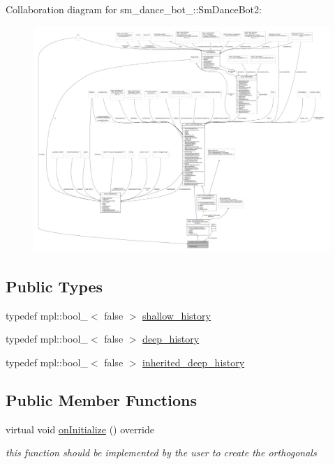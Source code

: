 Collaboration diagram for sm\+\_\+dance\+\_\+bot\+\_\+:\+:Sm\+Dance\+Bot2\+:
\nopagebreak
\begin{figure}[H]
\begin{center}
\leavevmode
\includegraphics[width=350pt]{structsm__dance__bot__2_1_1SmDanceBot2__coll__graph}
\end{center}
\end{figure}
\subsection*{Public Types}
\begin{DoxyCompactItemize}
\item 
typedef mpl\+::bool\+\_\+$<$ false $>$ \hyperlink{structsm__dance__bot__2_1_1SmDanceBot2_ad3a8eb7fc5a22b52a82fa2eb78504b55}{shallow\+\_\+history}
\item 
typedef mpl\+::bool\+\_\+$<$ false $>$ \hyperlink{structsm__dance__bot__2_1_1SmDanceBot2_af2705978b4ad0ad249c794c36deec888}{deep\+\_\+history}
\item 
typedef mpl\+::bool\+\_\+$<$ false $>$ \hyperlink{structsm__dance__bot__2_1_1SmDanceBot2_ae513d989139d1c9f5e446b4624403aef}{inherited\+\_\+deep\+\_\+history}
\end{DoxyCompactItemize}
\subsection*{Public Member Functions}
\begin{DoxyCompactItemize}
\item 
virtual void \hyperlink{structsm__dance__bot__2_1_1SmDanceBot2_a15cabce5763a486bf6ace2ed5850480c}{on\+Initialize} () override
\begin{DoxyCompactList}\small\item\em this function should be implemented by the user to create the orthogonals \end{DoxyCompactList}\end{DoxyCompactItemize}

